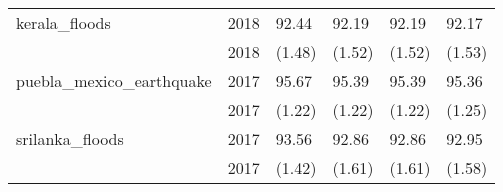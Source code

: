 \begin{tabular}{llllll}
kerala\_floods            &  2018 &     92.44 &   92.19 &    92.19 &   92.17 \\
                         &  2018 &    (1.48) &  (1.52) &   (1.52) &  (1.53) \\
puebla\_mexico\_earthquake &  2017 &     95.67 &   95.39 &    95.39 &   95.36 \\
                         &  2017 &    (1.22) &  (1.22) &   (1.22) &  (1.25) \\
srilanka\_floods          &  2017 &     93.56 &   92.86 &    92.86 &   92.95 \\
                         &  2017 &    (1.42) &  (1.61) &   (1.61) &  (1.58) \\
\bottomrule
\end{tabular}
